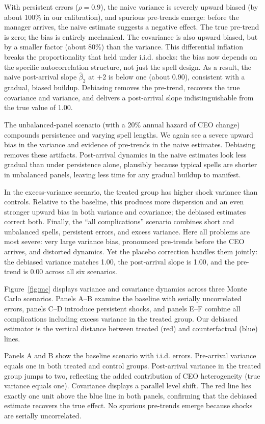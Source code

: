 \documentclass[11pt,a4paper]{article}
\begin{document}
With persistent errors ($\rho=0.9$), the naive variance is severely upward biased (by about 100\% in our calibration), and spurious pre-trends emerge: before the manager arrives, the naive estimate suggests a negative effect. The true pre-trend is zero; the bias is entirely mechanical. The covariance is also upward biased, but by a smaller factor (about 80\%) than the variance. This differential inflation breaks the proportionality that held under i.i.d. shocks: the bias now depends on the specific autocorrelation structure, not just the spell design. As a result, the naive post-arrival slope $\hat\beta_2$ at $+2$ is below one (about 0.90), consistent with a gradual, biased buildup. Debiasing removes the pre-trend, recovers the true covariance and variance, and delivers a post-arrival slope indistinguishable from the true value of 1.00.

The unbalanced-panel scenario (with a 20\% annual hazard of CEO change) compounds persistence and varying spell lengths. We again see a severe upward bias in the variance and evidence of pre-trends in the naive estimates. Debiasing removes these artifacts. Post-arrival dynamics in the naive estimates look less gradual than under persistence alone, plausibly because typical spells are shorter in unbalanced panels, leaving less time for any gradual buildup to manifest.

In the excess-variance scenario, the treated group has higher shock variance than controls. Relative to the baseline, this produces more dispersion and an even stronger upward bias in both variance and covariance; the debiased estimates correct both. Finally, the ``all complications'' scenario combines short and unbalanced spells, persistent errors, and excess variance. Here all problems are most severe: very large variance bias, pronounced pre-trends before the CEO arrives, and distorted dynamics. Yet the placebo correction handles them jointly: the debiased variance matches 1.00, the post-arrival slope is 1.00, and the pre-trend is 0.00 across all six scenarios. 

Figure~\ref{fig:mc} displays variance and covariance dynamics across three Monte Carlo scenarios. Panels A--B examine the baseline with serially uncorrelated errors, panels C--D introduce persistent shocks, and panels E--F combine all complications including excess variance in the treated group. Our debiased estimator is the vertical distance between treated (red) and counterfactual (blue) lines.

Panels A and B show the baseline scenario with i.i.d. errors. Pre-arrival variance equals one in both treated and control groups. Post-arrival variance in the treated group jumps to two, reflecting the added contribution of CEO heterogeneity (true variance equals one). Covariance displays a parallel level shift. The red line lies exactly one unit above the blue line in both panels, confirming that the debiased estimate recovers the true effect. No spurious pre-trends emerge because shocks are serially uncorrelated. 
\end{document}
